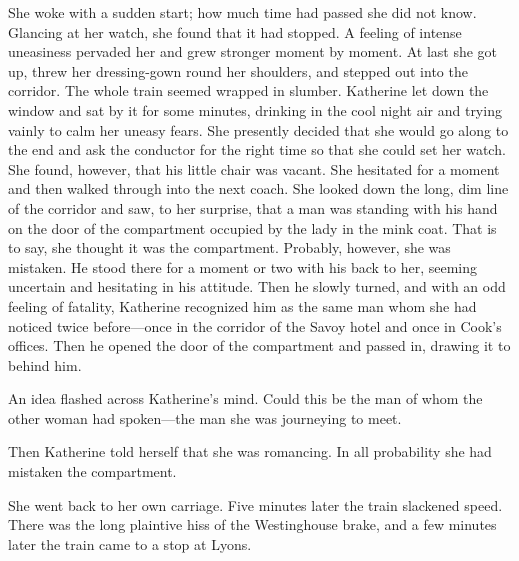 She woke with a sudden start; how much time had passed she did not know. Glancing at her watch, she found that it had stopped. A feeling of intense uneasiness pervaded her and grew stronger moment by moment. At last she got up, threw her dressing-gown round her shoulders, and stepped out into the corridor. The whole train seemed wrapped in slumber. Katherine let down the window and sat by it for some minutes, drinking in the cool night air and trying vainly to calm her uneasy fears. She presently decided that she would go along to the end and ask the conductor for the right time so that she could set her watch. She found, however, that his little chair was vacant. She hesitated for a moment and then walked through into the next coach. She looked down the long, dim line of the corridor and saw, to her surprise, that a man was standing with his hand on the door of the compartment occupied by the lady in the mink coat. That is to say, she thought it was the compartment. Probably, however, she was mistaken. He stood there for a moment or two with his back to her, seeming uncertain and hesitating in his attitude. Then he slowly turned, and with an odd feeling of fatality, Katherine recognized him as the same man whom she had noticed twice before—once in the corridor of the Savoy hotel and once in Cook's offices. Then he opened the door of the compartment and passed in, drawing it to behind him.

An idea flashed across Katherine's mind. Could this be the man of whom the other woman had spoken—the man she was journeying to meet.

Then Katherine told herself that she was romancing. In all probability she had mistaken the compartment.

She went back to her own carriage. Five minutes later the train slackened speed. There was the long plaintive hiss of the Westinghouse brake, and a few minutes later the train came to a stop at Lyons.